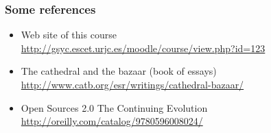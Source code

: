 
% 
% 


\begin{frame}
\frametitle{Some references}

\begin{itemize}
\item Web site of this course \\
  \url{http://gsyc.escet.urjc.es/moodle/course/view.php?id=123}
\item The cathedral and the bazaar (book of essays) \\
  \url{http://www.catb.org/esr/writings/cathedral-bazaar/}
\item Open Sources 2.0 The Continuing Evolution \\
  \url{http://oreilly.com/catalog/9780596008024/}
\end{itemize}

\end{frame}
